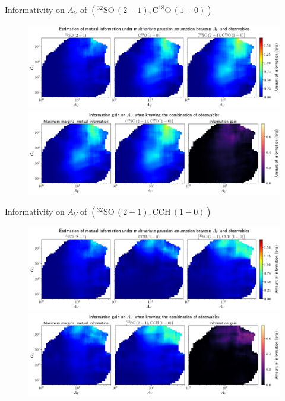 \documentclass{beamer}
\begin{document}
\begin{frame}{Informativity on $A_V$ of $\left(\mathrm{^{32}SO\,(2-1)},\mathrm{C^{18}O\,(1-0)}\right)$}
    \begin{figure}
        \centering
        \includegraphics[width=0.95\linewidth]{../linearinfogauss/av__32so21_c18o10_linearinfogauss.png}
        \vfill
        \includegraphics[width=0.95\linewidth]{../linearinfogauss/av__32so21_c18o10_linearinfogauss_gain.png}
    \end{figure}
\end{frame}

\begin{frame}{Informativity on $A_V$ of $\left(\mathrm{^{32}SO\,(2-1)},\mathrm{CCH\,(1-0)}\right)$}
    \begin{figure}
        \centering
        \includegraphics[width=0.95\linewidth]{../linearinfogauss/av__32so21_cch10_linearinfogauss.png}
        \vfill
        \includegraphics[width=0.95\linewidth]{../linearinfogauss/av__32so21_cch10_linearinfogauss_gain.png}
    \end{figure}
\end{frame}
\end{document}
